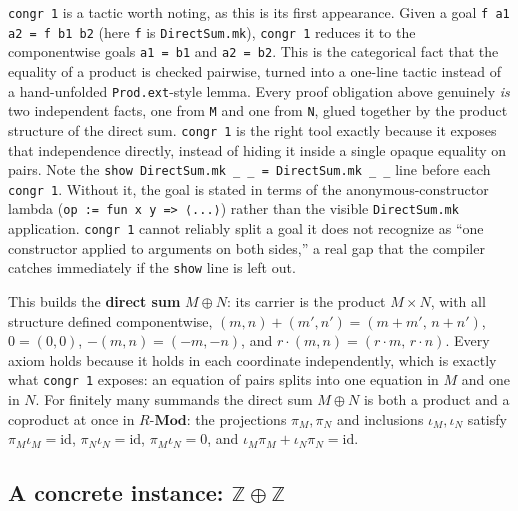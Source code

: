 \texttt{congr 1} is a tactic worth noting, as this is its first appearance. Given a goal \texttt{f a1 a2 = f b1 b2} (here \texttt{f} is \texttt{DirectSum.mk}), \texttt{congr 1} reduces it to the componentwise goals \texttt{a1 = b1} and \texttt{a2 = b2}. This is the categorical fact that the equality of a product is checked pairwise, turned into a one-line tactic instead of a hand-unfolded \texttt{Prod.ext}-style lemma. Every proof obligation above genuinely \emph{is} two independent facts, one from \texttt{M} and one from \texttt{N}, glued together by the product structure of the direct sum. \texttt{congr 1} is the right tool exactly because it exposes that independence directly, instead of hiding it inside a single opaque equality on pairs. Note the \texttt{show DirectSum.mk \_\allowbreak{} \_\allowbreak{} = DirectSum.mk \_\allowbreak{} \_\allowbreak{}} line before each \texttt{congr 1}. Without it, the goal is stated in terms of the anonymous-constructor lambda (\texttt{op := fun x y => ⟨...⟩}) rather than the visible \texttt{DirectSum.mk} application. \texttt{congr 1} cannot reliably split a goal it does not recognize as ``one constructor applied to arguments on both sides,'' a real gap that the compiler catches immediately if the \texttt{show} line is left out.

\begin{mathreading}

This builds the \textbf{direct sum} \(M \oplus N\): its carrier is the product \(M \times N\), with all structure defined componentwise, \((m,n) + (m',n') = (m+m',\, n+n')\), \(0 = (0,0)\), \(-(m,n) = (-m,-n)\), and \(r\cdot(m,n) = (r\cdot m,\, r\cdot n)\). Every axiom holds because it holds in each coordinate independently, which is exactly what \texttt{congr 1} exposes: an equation of pairs splits into one equation in \(M\) and one in \(N\). For finitely many summands the direct sum \(M \oplus N\) is both a product and a coproduct at once in \(R\text{-}\mathbf{Mod}\): the projections \(\pi_M, \pi_N\) and inclusions \(\iota_M, \iota_N\) satisfy \(\pi_M\iota_M = \mathrm{id}\), \(\pi_N\iota_N = \mathrm{id}\), \(\pi_M\iota_N = 0\), and \(\iota_M\pi_M + \iota_N\pi_N = \mathrm{id}\).

\end{mathreading}

\begin{center}

\end{center}

\subsection{\texorpdfstring{A concrete instance: \(\mathbb{Z} \oplus \mathbb{Z}\)}{A concrete instance: \textbackslash mathbb\{Z\} \textbackslash oplus \textbackslash mathbb\{Z\}}}\label{sec:10-modules:06-direct-sums:2}

